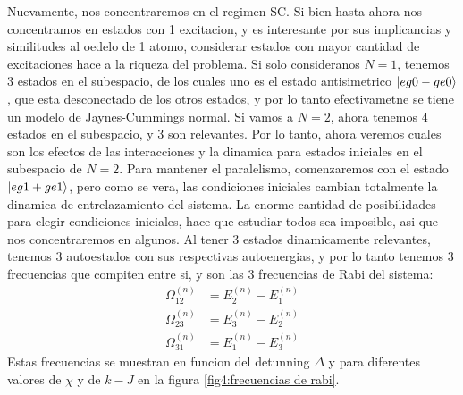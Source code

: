 Nuevamente, nos concentraremos en el regimen SC. Si bien hasta ahora nos concentramos en estados con 1 excitacion, y es interesante por sus implicancias y similitudes al oedelo de 1 atomo, considerar estados con mayor cantidad de excitaciones hace a la riqueza del problema. Si solo consideranos $N=1$, tenemos 3 estados en el subespacio, de los cuales uno es el estado antisimetrico $\ket{eg0-ge0}$, que esta desconectado de los otros estados, y por lo tanto efectivametne se tiene un modelo de Jaynes-Cummings normal. Si vamos a $N=2$, ahora tenemos 4 estados en el subespacio, y 3 son relevantes. Por lo tanto, ahora veremos cuales son los efectos de las interacciones y la dinamica para estados iniciales en el subespacio de $N=2$. Para mantener el paralelismo, comenzaremos con el estado $\ket{eg1+ge1}$, pero como se vera, las condiciones iniciales cambian totalmente la dinamica de entrelazamiento del sistema. La enorme cantidad de posibilidades para elegir condiciones iniciales, hace que estudiar todos sea imposible, asi que nos concentraremos en algunos.
Al tener 3 estados dinamicamente relevantes, tenemos 3 autoestados con sus respectivas autoenergias, y por lo tanto tenemos 3 frecuencias que compiten entre si, y son las 3 frecuencias de Rabi del sistema:
\begin{equation}
    \begin{aligned}
        \Omega^{(n)}_{12} &= E^{(n)}_2-E^{(n)}_1 \\
        \Omega^{(n)}_{23} &=E^{(n)}_3-E^{(n)}_2 \\
        \Omega^{(n)}_{31} &= E^{(n)}_1-E^{(n)}_3         
    \end{aligned}
    \label{ec4:frecuencias de rabi}
\end{equation}
Estas frecuencias se muestran en funcion del detunning $\Delta$ y para diferentes valores de $\chi$ y de $k-J$ en la figura \ref{fig4:frecuencias de rabi}.
